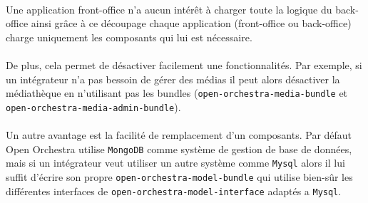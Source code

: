    \paragraph{}
    Une application front-office n'a aucun intérêt à charger toute la logique du back-office ainsi grâce à ce découpage chaque application (front-office ou back-office) charge uniquement les composants qui lui est nécessaire.
   \paragraph{}
   De plus, cela permet de désactiver facilement une fonctionnalités. Par exemple, si un intégrateur n'a pas bessoin de gérer des médias il peut alors désactiver la médiathèque en n'utilisant pas les bundles (\verb?open-orchestra-media-bundle? et \verb?open-orchestra-media-admin-bundle?).

   \paragraph{}
   Un autre avantage est la facilité de remplacement d'un composants. Par défaut Open Orchestra utilise \verb?MongoDB? comme système de gestion de base de données, mais si un intégrateur veut utiliser un autre système comme \verb?Mysql? alors il lui suffit d'écrire son propre \newline  \verb?open-orchestra-model-bundle? qui utilise bien-sûr les différentes interfaces de  \newline  \verb?open-orchestra-model-interface? adaptés a \verb?Mysql?.